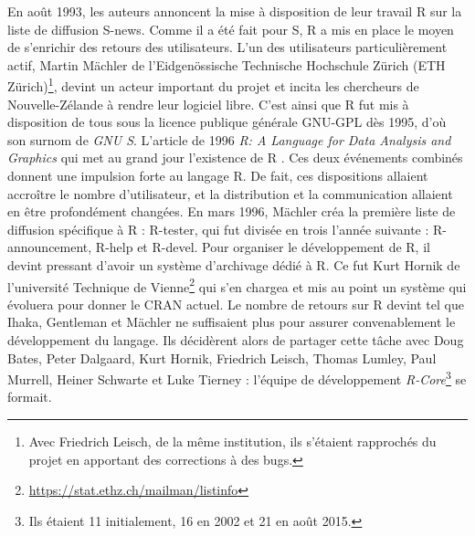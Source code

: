 \documentclass[]{article}
\begin{document}
En août 1993, les auteurs annoncent la mise à disposition de leur travail R sur la liste de diffusion S-news. Comme il a été fait pour S, R a mis en place le moyen de s'enrichir des retours des utilisateurs. L'un des utilisateurs particulièrement actif, Martin Mächler de l'Eidgenössische Technische Hochschule Zürich (ETH Zürich)\footnote{Avec Friedrich Leisch, de la même institution, ils s'étaient rapprochés du projet en apportant des corrections à des bugs.}, devint un acteur important du projet et incita les chercheurs de Nouvelle-Zélande à rendre leur logiciel libre. C'est ainsi que R fut mis à disposition de tous sous la licence publique générale GNU-GPL dès 1995, d'où son surnom de \emph{GNU S}. L'article de 1996 \emph{R: A Language for Data Analysis and Graphics} qui met au grand jour l'existence de R \citep{ihaka_r_1996}. Ces deux événements combinés donnent une impulsion forte au langage R. De fait, ces dispositions allaient accroître le nombre d'utilisateur, et la distribution et la communication allaient en être profondément changées. En mars 1996, Mächler créa la première liste de diffusion spécifique à R : R-tester, qui fut divisée en trois l'année suivante : R-announcement, R-help et R-devel. Pour organiser le développement de R, il devint pressant d'avoir un système d'archivage dédié à R. Ce fut Kurt Hornik de l'université Technique de Vienne\footnote{\url{https://stat.ethz.ch/mailman/listinfo}} qui s'en chargea et mis au point un système qui évoluera pour donner le CRAN actuel. Le nombre de retours sur R devint tel que Ihaka, Gentleman et Mächler ne suffisaient plus pour assurer convenablement le développement du langage. Ils décidèrent alors de partager cette tâche avec Doug Bates, Peter Dalgaard, Kurt Hornik, Friedrich Leisch, Thomas Lumley, Paul Murrell, Heiner Schwarte et Luke Tierney : l'équipe de développement \emph{R-Core}\footnote{Ils étaient 11 initialement, 16 en 2002 et 21 en août 2015.} se formait.
\end{document}
